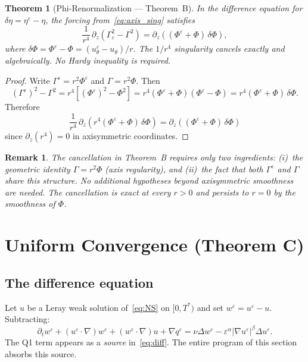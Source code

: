 \documentclass[11pt]{article}
\newtheorem{theorem}{Theorem}[section]
\newtheorem*{remark}{Remark}
\newcommand{\eps}{\varepsilon}
\begin{document}
\begin{theorem}[Phi-Renormalization --- Theorem~B]\label{thm:B}
In the difference equation for $\delta\eta = \eta^\eps - \eta$,
the forcing from~\eqref{eq:axis_sing} satisfies
\begin{equation}\label{eq:phi_renorm}
  \frac{1}{r^4}\,\partial_z\!\left(\Gamma_\eps^2 - \Gamma^2\right)
  = \partial_z\!\left((\Phi^\eps+\Phi)\,\delta\Phi\right),
\end{equation}
where $\delta\Phi = \Phi^\eps - \Phi = (u^\eps_\theta - u_\theta)/r$.
The $1/r^4$ singularity cancels exactly and algebraically.
No Hardy inequality is required.
\end{theorem}

\begin{proof}
Write $\Gamma^\eps = r^2\Phi^\eps$ and $\Gamma = r^2\Phi$. Then
\[
  (\Gamma^\eps)^2 - \Gamma^2
  = r^4\!\left[(\Phi^\eps)^2 - \Phi^2\right]
  = r^4(\Phi^\eps+\Phi)(\Phi^\eps-\Phi)
  = r^4(\Phi^\eps+\Phi)\,\delta\Phi.
\]
Therefore
\[
  \frac{1}{r^4}\,\partial_z\!\left(r^4(\Phi^\eps+\Phi)\,\delta\Phi\right)
  = \partial_z\!\left((\Phi^\eps+\Phi)\,\delta\Phi\right)
\]
since $\partial_z(r^4)=0$ in axisymmetric coordinates.
\end{proof}

\begin{remark}
The cancellation in Theorem~B requires only two ingredients:
(i)~the geometric identity $\Gamma = r^2\Phi$ (axis regularity),
and (ii)~the fact that both $\Gamma^\eps$ and $\Gamma$ share this
structure. No additional hypotheses beyond axisymmetric smoothness
are needed. The cancellation is exact at every $r>0$ and persists
to $r=0$ by the smoothness of $\Phi$.
\end{remark}

\section{Uniform Convergence (Theorem C)}

\subsection{The difference equation}

Let $u$ be a Leray weak solution of~\eqref{eq:NS} on $[0,T^*)$
and set $w^\eps = u^\eps - u$. Subtracting:
\begin{equation}\label{eq:diff}
  \partial_t w^\eps + (u^\eps\cdot\nabla)w^\eps
  + (w^\eps\cdot\nabla)u + \nabla q^\eps
  = \nu\Delta w^\eps
  - \eps^\alpha|\nabla u^\eps|^\beta\Delta u^\eps.
\end{equation}
The Q1 term appears as a \emph{source} in~\eqref{eq:diff}.
The entire program of this section absorbs this source.
\end{document}
